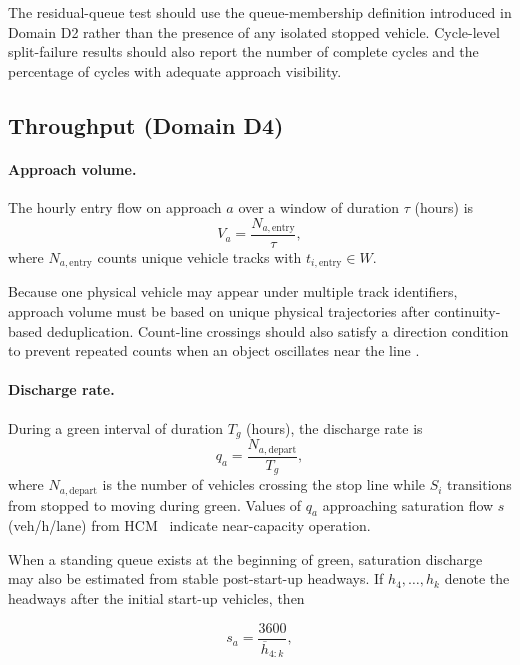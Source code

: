 \documentclass[11pt]{article}
\begin{document}
The residual-queue test should use the queue-membership definition introduced
in Domain D2 rather than the presence of any isolated stopped vehicle.
Cycle-level split-failure results should also report the number of complete
cycles and the percentage of cycles with adequate approach visibility.

\subsection{Throughput (Domain D4)}

\paragraph{Approach volume.} The hourly entry flow on approach $a$ over a window of duration $\tau$ (hours) is
\begin{equation}
 V_a=\frac{N_{a,\mathrm{entry}}}{\tau},
\end{equation}
where $N_{a,\mathrm{entry}}$ counts unique vehicle tracks with $t_{i,\mathrm{entry}}\in W$.

Because one physical vehicle may appear under multiple track identifiers,
approach volume must be based on unique physical trajectories after
continuity-based deduplication. Count-line crossings should also satisfy a
direction condition to prevent repeated counts when an object oscillates near
the line
\cite{nayak2025dual,shang2026roadside}.

\paragraph{Discharge rate.} During a green interval of duration $T_g$ (hours), the discharge rate is
\begin{equation}
 q_a=\frac{N_{a,\mathrm{depart}}}{T_g},
\end{equation}
where $N_{a,\mathrm{depart}}$ is the number of vehicles crossing the stop line while $S_i$ transitions from stopped to moving during green. Values of $q_a$ approaching saturation flow $s$ (veh/h/lane) from HCM~\cite{hcm} indicate near-capacity operation.

When a standing queue exists at the beginning of green, saturation discharge
may also be estimated from stable post-start-up headways. If
$h_4,\ldots,h_k$ denote the headways after the initial start-up vehicles, then

\begin{equation}
 s_a=\frac{3600}{\overline{h}_{4:k}},
\end{equation}
\end{document}
